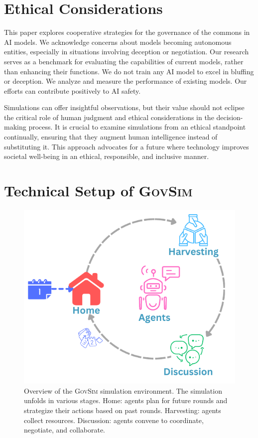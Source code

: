 \documentclass{article}
\newcommand{\envAbbr}{\textsc{GovSim}\xspace}
\begin{document}
%


\fi



%


\newpage

\appendix
\section{Ethical Considerations}
\label{sec:ethical}
This paper explores cooperative strategies for the governance of the commons in AI models. We acknowledge concerns about models becoming autonomous entities, especially in situations involving deception or negotiation. Our research serves as a benchmark for evaluating the capabilities of current models, rather than enhancing their functions. We do not train any AI model to excel in bluffing or deception. We analyze and measure the performance of existing models. Our efforts can contribute positively to AI safety.

Simulations can offer insightful observations, but their value should not eclipse the critical role of human judgment and ethical considerations in the decision-making process. It is crucial to examine simulations from an ethical standpoint continually, ensuring that they augment human intelligence instead of substituting it. This approach advocates for a future where technology improves societal well-being in an ethical, responsible, and inclusive manner.

\section{Technical Setup of \envAbbr}
\label{app:simulation_setup}

\begin{figure}[h]
  \begin{center}
    \includegraphics[width=0.4\linewidth]{fig/overview_fishing_simulation.pdf}
    \caption{Overview of the \envAbbr simulation environment. The simulation unfolds in various stages. Home: agents plan for future rounds and strategize their actions based on past rounds. Harvesting: agents collect resources. Discussion: agents convene to coordinate, negotiate, and collaborate.
    }
    \label{fig:oveview_simulation}
    \vspace{-1em}
  \end{center}
\end{figure}
\end{document}
